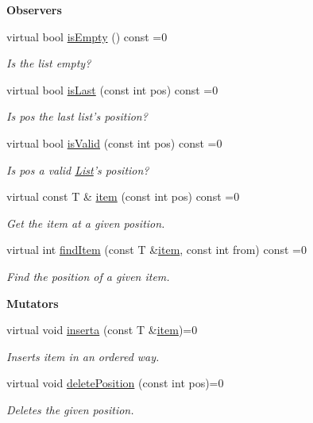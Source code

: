 \begin{Indent}{\bf Observers}\par
\begin{DoxyCompactItemize}
\item 
virtual bool \hyperlink{classedi_1_1List_a99f1769968b6366cebdc529fc208a39c}{is\+Empty} () const =0
\begin{DoxyCompactList}\small\item\em Is the list empty? \end{DoxyCompactList}\item 
virtual bool \hyperlink{classedi_1_1List_aa1cc10f88bb6684fbb523987d51f341a}{is\+Last} (const int pos) const =0
\begin{DoxyCompactList}\small\item\em Is pos the last list's position? \end{DoxyCompactList}\item 
virtual bool \hyperlink{classedi_1_1List_ab3befc73438a24042d3aa6248e8a0e74}{is\+Valid} (const int pos) const =0
\begin{DoxyCompactList}\small\item\em Is pos a valid \hyperlink{classedi_1_1List}{List}'s position? \end{DoxyCompactList}\item 
virtual const T \& \hyperlink{classedi_1_1List_a7a7923cfc7a3a50f816be51bb49ba698}{item} (const int pos) const =0
\begin{DoxyCompactList}\small\item\em Get the item at a given position. \end{DoxyCompactList}\item 
virtual int \hyperlink{classedi_1_1List_a7dea612396f8ca58e9c97665dd7de750}{find\+Item} (const T \&\hyperlink{classedi_1_1List_a7a7923cfc7a3a50f816be51bb49ba698}{item}, const int from) const =0
\begin{DoxyCompactList}\small\item\em Find the position of a given item. \end{DoxyCompactList}\end{DoxyCompactItemize}
\end{Indent}
\begin{Indent}{\bf Mutators}\par
\begin{DoxyCompactItemize}
\item 
virtual void \hyperlink{classedi_1_1List_ae6f16aa8fcd3c6e5b93e6258ac89b335}{inserta} (const T \&\hyperlink{classedi_1_1List_a7a7923cfc7a3a50f816be51bb49ba698}{item})=0
\begin{DoxyCompactList}\small\item\em Inserts item in an ordered way. \end{DoxyCompactList}\item 
virtual void \hyperlink{classedi_1_1List_a0b73c2aa55f28edd4908182fa34aea5d}{delete\+Position} (const int pos)=0
\begin{DoxyCompactList}\small\item\em Deletes the given position. \end{DoxyCompactList}\end{DoxyCompactItemize}
\end{Indent}


